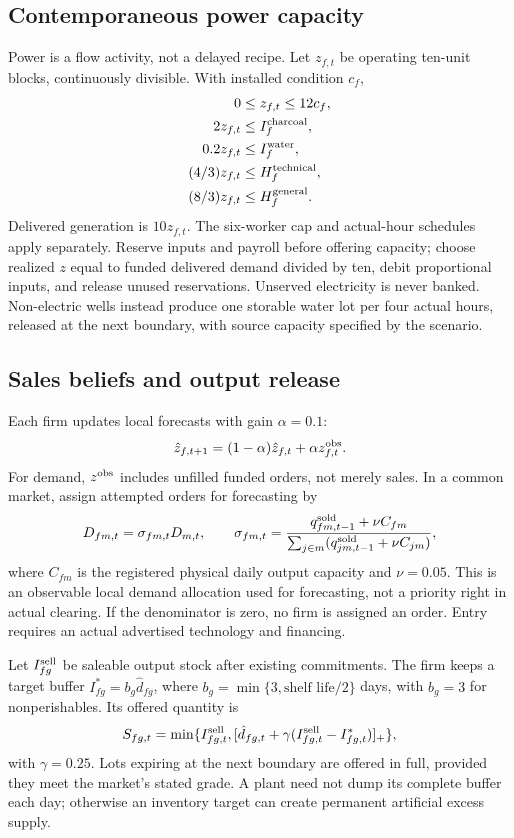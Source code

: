 \documentclass[10pt,a4paper,twocolumn]{article}
\begin{document}
\subsection{Contemporaneous power capacity}
Power is a flow activity, not a delayed recipe. Let $z_{f,t}$ be operating
ten-unit blocks, continuously divisible. With installed condition $c_f$,
\[
\begin{aligned}
 0&\le z_{f,t}\le 12c_f,\\
2z_{f,t}&\le I^{\rm charcoal}_f,\\
0.2z_{f,t}&\le I^{\rm water}_f,\\
(4/3)z_{f,t}&\le H^{\rm technical}_f,\\
(8/3)z_{f,t}&\le H^{\rm general}_f.
\end{aligned}
\]
Delivered generation is $10z_{f,t}$. The six-worker cap and actual-hour
schedules apply separately. Reserve inputs and payroll before offering
capacity; choose realized $z$ equal to funded delivered demand divided by
ten, debit proportional inputs, and release unused reservations.
Unserved electricity is never banked. Non-electric wells instead produce
one storable water lot per four actual hours, released at the next
boundary, with source capacity specified by the scenario.

\subsection{Sales beliefs and output release}
Each firm updates local forecasts with gain $\alpha=0.1$:
\begin{equation}
 \hat z_{f,t+1}=(1-\alpha)\hat z_{f,t}+\alpha z^{\rm obs}_{f,t}.
 \label{eq:forecast}
\end{equation}
For demand, $z^{\rm obs}$ includes unfilled funded orders, not merely
sales. In a common market, assign attempted orders for forecasting by
\begin{equation}
 D_{fm,t}=\sigma_{fm,t}D_{m,t},\qquad
 \sigma_{fm,t}=
 \frac{q^{\rm sold}_{fm,t-1}+\nu C_{fm}}
 {\sum_{j\in m}(q^{\rm sold}_{jm,t-1}+\nu C_{jm})},
 \label{eq:share}
\end{equation}
where $C_{fm}$ is the registered physical daily output capacity and
$\nu=0.05$. This is an observable local demand allocation used for
forecasting, not a priority right in actual clearing. If the denominator
is zero, no firm is assigned an order. Entry requires an actual
advertised technology and financing.

Let $I^{\rm sell}_{fg}$ be saleable output stock after existing
commitments. The firm keeps a target buffer $I^*_{fg}=b_g\hat d_{fg}$,
where $b_g=\min\{3,\text{shelf life}/2\}$ days, with $b_g=3$ for
nonperishables. Its offered quantity is
\begin{equation}
 S_{fg,t}=\min\{I^{\rm sell}_{fg,t},
 [\hat d_{fg,t}+\gamma(I^{\rm sell}_{fg,t}-I^*_{fg,t})]_+\},
 \label{eq:release}
\end{equation}
with $\gamma=0.25$. Lots expiring at the next boundary are offered in
full, provided they meet the market's stated grade. A plant need not dump
its complete buffer each day; otherwise an inventory target can create
permanent artificial excess supply.
\end{document}

